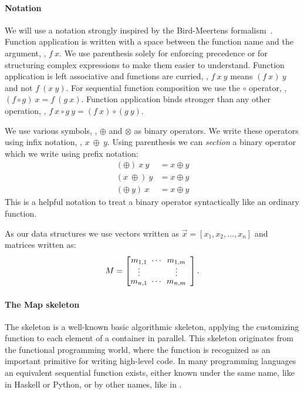 \paragraph{Notation}
\label{par:notation}
We will use a notation strongly inspired by the Bird-Meertens formalism~\cite{Bird88}.
Function application is written with a space between the function name and the argument, \ie, $f\ x$.
We use parenthesis solely for enforcing precedence or for structuring complex expressions to make them easier to understand.
Function application is left associative and functions are curried, \ie, $f\ x\ y$ means $(f\ x)\ y$ and not $f\ (x\ y)$.
For sequential function composition we use the $\circ$ operator, \ie, $(f\circ g)\ x = f\ (g\ x)$.
Function application binds stronger than any other operation, \eg, $f\ x \circ g\ y = (f\ x) \circ (g\ y)$.

We use various symbols, \eg, $\oplus$ and $\otimes$ as binary operators.
We write these operators using infix notation, \ie, $x\ \oplus\ y$.
Using parenthesis we can \emph{section} a binary operator which we write using prefix notation:
\begin{align*}
  (\oplus)\ x\ y &= x \oplus y\\
  (x\ \oplus)\ y &=  x \oplus y\\
  (\oplus\ y)\ x &=  x \oplus y
\end{align*}
This is a helpful notation to treat a binary operator syntactically like an ordinary function.

As our data structures we use vectors written as $\vec{x} = [x_1, x_2, \ldots, x_n]$ and matrices written as:
\begin{align*}
M = \DottedMatrix{m_{1,1}}{m_{1,m}}{m_{n,1}}{m_{n,m}}.
\end{align*}

\paragraph{The Map skeleton}
The \map skeleton is a well-known basic algorithmic skeleton, applying the customizing function to each element of a container in parallel.
This skeleton originates from the functional programming world, where the  function is recognized as an important primitive for writing high-level code.
In many programming languages an equivalent sequential function exists, either known under the same name, like in Haskell or Python, or by other names, like  in \Cpp.

